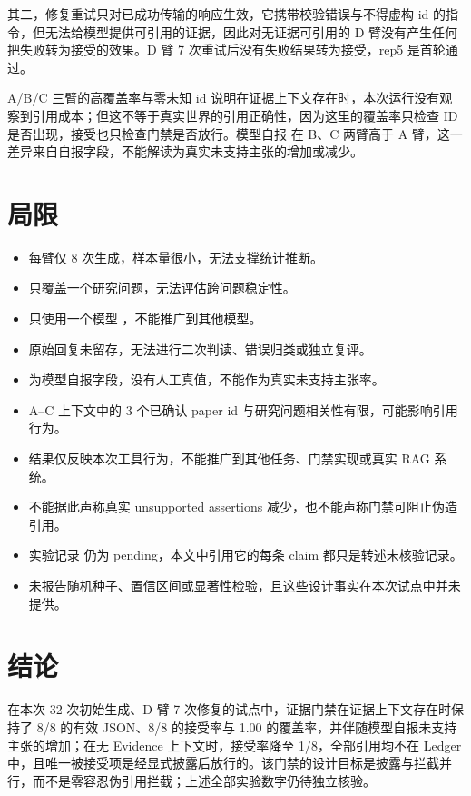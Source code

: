 \documentclass[UTF8]{ctexart}
\begin{document}
其二，修复重试只对已成功传输的响应生效，它携带校验错误与不得虚构 id 的指令，但无法给模型提供可引用的证据，因此对无证据可引用的 D 臂没有产生任何把失败转为接受的效果。D 臂 7 次重试后没有失败结果转为接受，rep5 是首轮通过。

A/B/C 三臂的高覆盖率与零未知 id 说明在证据上下文存在时，本次运行没有观察到引用成本；但这不等于真实世界的引用正确性，因为这里的覆盖率只检查 ID 是否出现，接受也只检查门禁是否放行。模型自报  在 B、C 两臂高于 A 臂，这一差异来自自报字段，不能解读为真实未支持主张的增加或减少。

\section{局限}

\begin{itemize}[leftmargin=1.6em]
  \item 每臂仅 8 次生成，样本量很小，无法支撑统计推断。
  \item 只覆盖一个研究问题，无法评估跨问题稳定性。
  \item 只使用一个模型 ，不能推广到其他模型。
  \item 原始回复未留存，无法进行二次判读、错误归类或独立复评。
  \item {} 为模型自报字段，没有人工真值，不能作为真实未支持主张率。
  \item A--C 上下文中的 3 个已确认 paper id 与研究问题相关性有限，可能影响引用行为。
  \item 结果仅反映本次工具行为，不能推广到其他任务、门禁实现或真实 RAG 系统。
  \item 不能据此声称真实 unsupported assertions 减少，也不能声称门禁可阻止伪造引用。
  \item 实验记录  仍为 pending，本文中引用它的每条 claim 都只是转述未核验记录。
  \item 未报告随机种子、置信区间或显著性检验，且这些设计事实在本次试点中并未提供。
\end{itemize}

\section{结论}

在本次 32 次初始生成、D 臂 7 次修复的试点中，证据门禁在证据上下文存在时保持了 8/8 的有效 JSON、8/8 的接受率与 1.00 的覆盖率，并伴随模型自报未支持主张的增加；在无 Evidence 上下文时，接受率降至 1/8，全部引用均不在 Ledger 中，且唯一被接受项是经显式披露后放行的。该门禁的设计目标是披露与拦截并行，而不是零容忍伪引用拦截；上述全部实验数字仍待独立核验。
\end{document}
